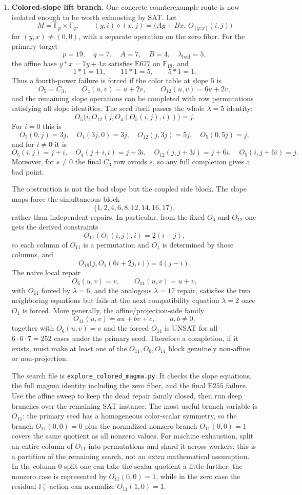 \documentclass[12pt]{article}
\newcommand{\op}{\diamond}
\newcommand{\E}[1]{\mathrm{E#1}}
\theoremstyle{definition}
\begin{document}
\begin{enumerate}[label=\textbf{\arabic*.}]
\item \textbf{Colored-slope lift branch.}
One concrete counterexample route is now isolated enough to be worth exhausting by SAT.
Let
\[
M=\mathbb F_p\times\mathbb F_q,
\qquad
(y,i)\op(x,j)=\bigl(Ay+Bx,\,O_{[y:x]}(i,j)\bigr)
\]
for $(y,x)\ne(0,0)$, with a separate operation on the zero fiber.  For the primary
target
\[
p=19,
\quad q=7,
\quad A=7,
\quad B=4,
\quad \lambda_{\mathrm{bad}}=5,
\]
the affine base $y*x=7y+4x$ satisfies $\E{677}$ on $\mathbb F_{19}$, and
\[
1*1=11,
\qquad 11*1=5,
\qquad 5*1=1.
\]
Thus a fourth-power failure is forced if the color table at slope $5$ is
\[
O_5=C_3,
\qquad
O_4(u,v)=u+2v,
\qquad
O_{12}(u,v)=6u+2v,
\]
and the remaining slope operations can be completed with row permutations satisfying all
slope identities.  The seed itself passes the whole $\lambda=5$ identity:
\[
O_5\bigl(i,O_{12}(j,O_4(O_5(i,j),i))\bigr)=j.
\]
For $i=0$ this is
\[
O_5(0,j)=3j,
\quad O_4(3j,0)=3j,
\quad O_{12}(j,3j)=5j,
\quad O_5(0,5j)=j,
\]
and for $i\ne0$ it is
\[
O_5(i,j)=j+i,
\quad O_4(j+i,i)=j+3i,
\quad O_{12}(j,j+3i)=j+6i,
\quad O_5(i,j+6i)=j.
\]
Moreover, for $s\ne0$ the final $C_3$ row avoids $s$, so any full completion gives a
bad point.

The obstruction is not the bad slope but the coupled side block.  The slope maps force
the simultaneous block
\[
\{1,2,4,6,8,12,14,16,17\},
\]
rather than independent repairs.  In particular, from the fixed $O_4$ and $O_{12}$ one
gets the derived constraints
\[
O_{11}(O_1(i,j),i)=2(i-j),
\]
so each column of $O_{11}$ is a permutation and $O_1$ is determined by those columns,
and
\[
O_{18}\bigl(j,O_1(6i+2j,i)\bigr)=4(j-i).
\]
The naive local repair
\[
O_6(u,v)=v,
\qquad O_{11}(u,v)=u+v,
\]
with $O_{14}$ forced by $\lambda=6$, and the analogous $\lambda=17$ repair, satisfies the
two neighboring equations but fails at the next compatibility equation $\lambda=2$ once
$O_1$ is forced.  More generally, the affine/projection-side family
\[
O_{11}(u,v)=au+bv+c,
\qquad a,b\ne0,
\]
together with $O_6(u,v)=v$ and the forced $O_{14}$ is UNSAT for all $6\cdot6\cdot7=252$
cases under the primary seed.  Therefore a completion, if it exists, must make at least
one of the $O_{11},O_6,O_{14}$ block genuinely non-affine or non-projection.

The search file is \texttt{explore\_colored\_magma.py}.  It checks the slope equations,
the full magma identity including the zero fiber, and the final $\E{255}$ failure.  Use
the affine sweep to keep the dead repair family closed, then run deep branches over the
remaining SAT instance.  The most useful branch variable is $O_{11}$: the primary seed
has a homogeneous color-scalar symmetry, so the branch $O_{11}(0,0)=0$ plus the normalized
nonzero branch $O_{11}(0,0)=1$ covers the same quotient as all nonzero values.  For
machine exhaustion, split an entire column of $O_{11}$ into permutations and shard it
across workers; this is a partition of the remaining search, not an extra mathematical
assumption.  In the column-$0$ split one can take the scalar quotient a little further:
the nonzero case is represented by $O_{11}(0,0)=1$, while in the zero case the residual
$\mathbb F_7^\times$-action can normalize $O_{11}(1,0)=1$.


\end{enumerate}
\end{document}
